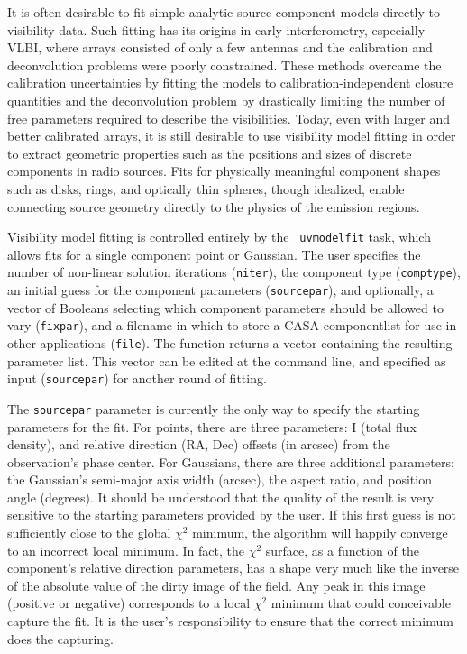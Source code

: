 It is often desirable to fit simple analytic source component models
directly to visibility data.  Such fitting has its origins in early
interferometry, especially VLBI, where arrays consisted of only a few
antennas and the calibration and deconvolution problems were poorly
constrained.  These methods overcame the calibration uncertainties by
fitting the models to calibration-independent closure quantities and
the deconvolution problem by drastically limiting the number of free
parameters required to describe the visibilities.  Today, even with
larger and better calibrated arrays, it is still desirable to use
visibility model fitting in order to extract geometric properties such
as the positions and sizes of discrete components in radio sources.
Fits for physically meaningful component shapes such as disks, rings,
and optically thin spheres, though idealized, enable connecting source
geometry directly to the physics of the emission regions.

Visibility model fitting is controlled entirely by the {\tt
uvmodelfit} task, which allows fits for a single component point or
Gaussian.  The user specifies the number of non-linear solution
iterations ({\tt niter}), the component type ({\tt comptype}), an
initial guess for the component parameters ({\tt sourcepar}), and
optionally, a vector of Booleans selecting which component parameters
should be allowed to vary ({\tt fixpar}), and a filename in which to
store a CASA componentlist for use in other applications ({\tt file}).
The function returns a vector containing the resulting parameter list.
This vector can be edited at the command line, and specified as input
({\tt sourcepar}) for another round of fitting.

The {\tt sourcepar} parameter is currently the only way to specify the
starting parameters for the fit.  For points, there are three
parameters: I (total flux density), and relative direction (RA, Dec)
offsets (in arcsec) from the observation's phase center.  For
Gaussians, there are three additional parameters: the Gaussian's
semi-major axis width (arcsec), the aspect ratio, and position angle
(degrees).  It should be understood that the quality of the result is
very sensitive to the starting parameters provided by the user.  If
this first guess is not sufficiently close to the global $\chi^2$
minimum, the algorithm will happily converge to an incorrect local
minimum.  In fact, the $\chi^2$ surface, as a function of the
component's relative direction parameters, has a shape very much like
the inverse of the absolute value of the dirty image of the field.
Any peak in this image (positive or negative) corresponds to a local
$\chi^2$ minimum that could conceivable capture the fit.  It is the
user's responsibility to ensure that the correct minimum does the
capturing.

